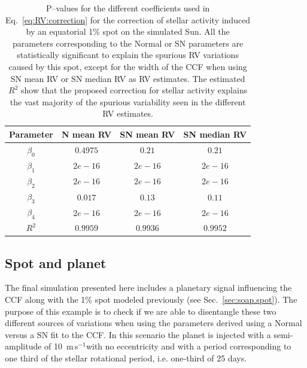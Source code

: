 \documentclass{aa}
\def\ms{\hbox{\,m\,s$^{-1}$}}         %
\begin{document}
\begin{table}
\begin{center}
\caption{P--values for the different coefficients used in Eq.~\ref{eq:RV:correction} for the correction of stellar activity induced by an equatorial 1\% spot on the simulated Sun. All the parameters corresponding to the Normal or SN parameters are statistically significant to explain the spurious RV variations caused by this spot, except for the width of the CCF when using SN mean RV or SN median RV as RV estimates. The estimated $R^{2}$ show that the proposed correction for stellar activity explains the vast majority of the spurious variability seen in the different RV estimates.}
\label{table:spot.test}
\begin{tabular}{|c|c|c|c|}
\hline
Parameter          & N mean RV         &   SN mean RV &   SN median RV \\
\hline
$\beta_{0}$            &    $0.4975$    & $0.21$ & $0.21$ \\
\hline
$\beta_{1}$            &    $2e-16$    & $2e-16$ & $2e-16$ \\
\hline
$\beta_{2}$            &     $2e-16$   &  $2e-16$ & $2e-16$\\
\hline
$\beta_{3}$            &     $0.017$   &  $0.13$ & $0.11$\\
\hline
$\beta_{4}$            &     $2e-16$   &  $2e-16$ & $2e-16$\\
\hline
$R^{2}$      &     $0.9959$    &  $0.9936$ & $0.9952$  \\
\hline
\end{tabular}
\end{center}
\end{table}

\subsection{Spot and planet} \label{sec:soap.spot.planet}

The final simulation presented here includes a planetary signal influencing the CCF along with the 1\% spot modeled previously (see Sec.~\ref{sec:soap.spot}). 
The purpose of this example is to check if we are able to disentangle these two different sources of variations when using the parameters derived using a Normal versus a SN fit to the CCF. In this scenario the planet is injected with a semi-amplitude of 10 \ms with no eccentricity and with a period corresponding to one third of the stellar rotational period, i.e. one-third of 25 days.
\end{document}
